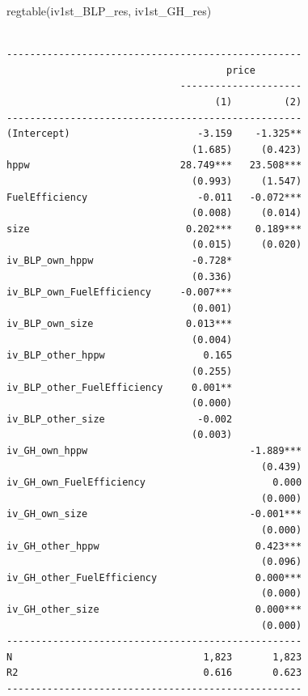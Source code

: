 \documentclass[
  letterpaper,
  DIV=11,
  numbers=noendperiod]{scrreprt}
\newenvironment{Shaded}{\begin{snugshade}}{\end{snugshade}}
\newcommand{\FunctionTok}[1]{\textcolor[rgb]{0.28,0.35,0.67}{#1}}
\newcommand{\NormalTok}[1]{\textcolor[rgb]{0.00,0.23,0.31}{#1}}
\begin{document}
\begin{Shaded}
\begin{Highlighting}[]
\FunctionTok{regtable}\NormalTok{(iv1st\_BLP\_res, iv1st\_GH\_res)}
\end{Highlighting}
\end{Shaded}

\begin{verbatim}

---------------------------------------------------
                                      price        
                              ---------------------
                                    (1)         (2)
---------------------------------------------------
(Intercept)                      -3.159    -1.325**
                                (1.685)     (0.423)
hppw                          28.749***   23.508***
                                (0.993)     (1.547)
FuelEfficiency                   -0.011   -0.072***
                                (0.008)     (0.014)
size                           0.202***    0.189***
                                (0.015)     (0.020)
iv_BLP_own_hppw                 -0.728*            
                                (0.336)            
iv_BLP_own_FuelEfficiency     -0.007***            
                                (0.001)            
iv_BLP_own_size                0.013***            
                                (0.004)            
iv_BLP_other_hppw                 0.165            
                                (0.255)            
iv_BLP_other_FuelEfficiency     0.001**            
                                (0.000)            
iv_BLP_other_size                -0.002            
                                (0.003)            
iv_GH_own_hppw                            -1.889***
                                            (0.439)
iv_GH_own_FuelEfficiency                      0.000
                                            (0.000)
iv_GH_own_size                            -0.001***
                                            (0.000)
iv_GH_other_hppw                           0.423***
                                            (0.096)
iv_GH_other_FuelEfficiency                 0.000***
                                            (0.000)
iv_GH_other_size                           0.000***
                                            (0.000)
---------------------------------------------------
N                                 1,823       1,823
R2                                0.616       0.623
---------------------------------------------------
\end{verbatim}
\end{document}

